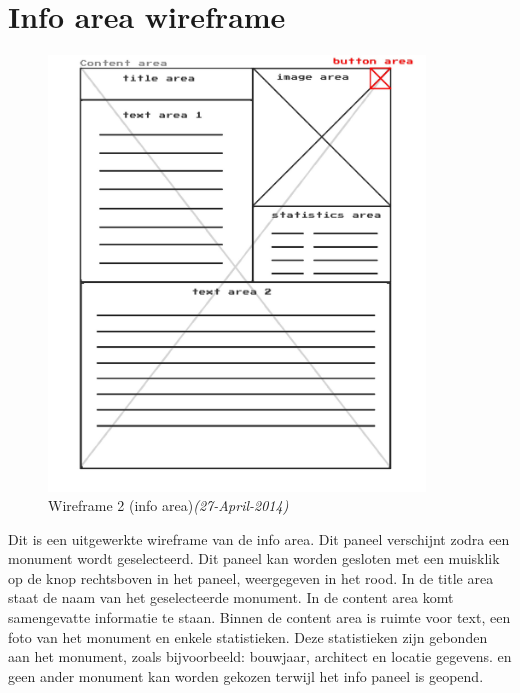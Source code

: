 \section{Info area wireframe} \label{sec:infowire}
\begin{figure}[h]
  \includegraphics[width=100mm]{figs/wireframe2.jpg}
  \caption{Wireframe 2 (info area)\textit{(27-April-2014)}}
  \label{fig:wireframe2}
\end{figure}

Dit is een uitgewerkte wireframe van de info area. Dit paneel verschijnt zodra een monument wordt geselecteerd. Dit paneel kan worden gesloten met een muisklik op de knop rechtsboven in het paneel, weergegeven in het rood. In de title area staat de naam van het geselecteerde monument. In de content area komt samengevatte informatie te staan. Binnen de content area is ruimte voor text, een foto van het monument en enkele statistieken. Deze statistieken zijn gebonden aan het monument, zoals bijvoorbeeld: bouwjaar, architect en locatie gegevens. en geen ander monument kan worden gekozen terwijl het info paneel is geopend.
\newpage
